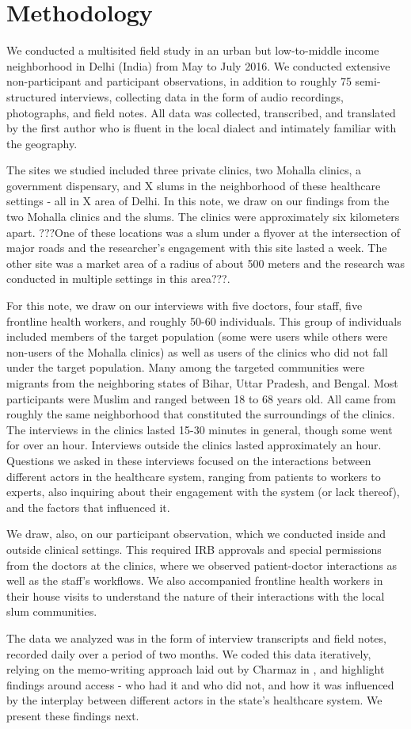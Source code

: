 \section{Methodology}
We conducted a multisited field study in an urban but low-to-middle income neighborhood in Delhi (India) from May to July 2016. We conducted extensive non-participant and participant observations, in addition to roughly 75 semi-structured interviews, collecting data in the form of audio recordings, photographs, and field notes. All data was collected, transcribed, and translated by the first author who is fluent in the local dialect and intimately familiar with the geography. 

The sites we studied included three private clinics, two Mohalla clinics, a government dispensary, and X slums in the neighborhood of these healthcare settings - all in X area of Delhi. In this note, we draw on our findings from the two Mohalla clinics and the slums. The clinics were approximately six kilometers apart. ???One of these locations was a slum under a flyover at the intersection of major roads and the researcher's engagement with this site lasted a week. The other site was a market area of a radius of about 500 meters and the research was conducted in multiple settings in this area???.

For this note, we draw on our interviews with five doctors, four staff, five frontline health workers, and roughly 50-60 individuals. This group of individuals included members of the target population (some were users while others were non-users of the Mohalla clinics) as well as users of the clinics who did not fall under the target population. Many among the targeted communities were migrants from the neighboring states of Bihar, Uttar Pradesh, and Bengal. Most participants were Muslim and ranged between 18 to 68 years old. All came from roughly the same neighborhood that constituted the surroundings of the clinics. The interviews in the clinics lasted 15-30 minutes in general, though some went for over an hour. Interviews outside the clinics lasted approximately an hour. Questions we asked in these interviews focused on the interactions between different actors in the healthcare system, ranging from patients to workers to experts, also inquiring about their engagement with the system (or lack thereof), and the factors that influenced it. 

We draw, also, on our participant observation, which we conducted inside and outside clinical settings. This required IRB approvals and special permissions from the doctors at the clinics, where we observed patient-doctor interactions as well as the staff's workflows. We also accompanied frontline health workers in their house visits to understand the nature of their interactions with the local slum communities.

The data we analyzed was in the form of interview transcripts and field notes, recorded daily over a period of two months. We coded this data iteratively, relying on the memo-writing approach laid out by Charmaz in \cite{}, and highlight findings around access - who had it and who did not, and how it was influenced by the interplay between different actors in the state's healthcare system. We present these findings next. %